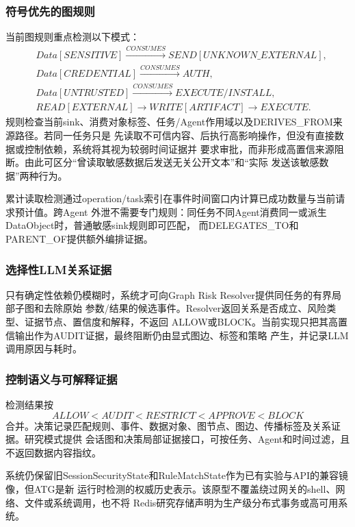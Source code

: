 \subsubsection{符号优先的图规则}

当前图规则重点检测以下模式：
\begin{align}
&Data[SENSITIVE]\xrightarrow{CONSUMES}SEND[UNKNOWN\_EXTERNAL],\\
&Data[CREDENTIAL]\xrightarrow{CONSUMES}AUTH,\\
&Data[UNTRUSTED]\xrightarrow{CONSUMES}EXECUTE/INSTALL,\\
&READ[EXTERNAL]\rightarrow WRITE[ARTIFACT]\rightarrow EXECUTE.
\end{align}
规则检查当前sink、消费对象标签、任务/Agent作用域以及DERIVES\_FROM来源路径。若同一任务只是
先读取不可信内容、后执行高影响操作，但没有直接数据或控制依赖，系统将其视为较弱时间证据并
要求审批，而非形成高置信来源阻断。由此可区分“曾读取敏感数据后发送无关公开文本”和“实际
发送该敏感数据”两种行为。

累计读取检测通过operation/task索引在事件时间窗口内计算已成功数量与当前请求预计值。跨Agent
外泄不需要专门规则：同任务不同Agent消费同一或派生DataObject时，普通敏感sink规则即可匹配，
而DELEGATES\_TO和PARENT\_OF提供额外编排证据。

\subsubsection{选择性LLM关系证据}

只有确定性依赖仍模糊时，系统才可向Graph Risk Resolver提供同任务的有界局部子图和去除原始
参数/结果的候选事件。Resolver返回关系是否成立、风险类型、证据节点、置信度和解释，不返回
ALLOW或BLOCK。当前实现只把其高置信输出作为AUDIT证据，最终阻断仍由显式图边、标签和策略
产生，并记录LLM调用原因与耗时。

\subsubsection{控制语义与可解释证据}

检测结果按
\begin{equation}
ALLOW<AUDIT<RESTRICT<APPROVE<BLOCK
\end{equation}
合并。决策记录匹配规则、事件、数据对象、图节点、图边、传播标签及关系证据。研究模式提供
会话图和决策局部证据接口，可按任务、Agent和时间过滤，且不返回数据内容指纹。

系统仍保留旧SessionSecurityState和RuleMatchState作为已有实验与API的兼容镜像，但ATG是新
运行时检测的权威历史表示。该原型不覆盖绕过网关的shell、网络、文件或系统调用，也不将
Redis研究存储声明为生产级分布式事务或高可用系统。
